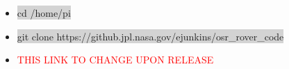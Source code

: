 \documentclass[12pt]{article}
\begin{document}
\begin{itemize}
	\item[] \colorbox{lightgray}{cd /home/pi}
	\item[] \colorbox{lightgray}{git clone https://github.jpl.nasa.gov/ejunkins/osr\_rover\_code}
	\item[] \textcolor{red}{THIS LINK TO CHANGE UPON RELEASE}
\end{itemize}

%
%
%
\end{document}
